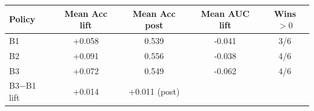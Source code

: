 \begin{tabular}{lcccc}
\toprule
Policy & Mean Acc lift & Mean Acc post & Mean AUC lift & Wins $>0$ \\
\midrule
B1 & +0.058 & 0.539 & -0.041 & 3/6 \\
B2 & +0.091 & 0.556 & -0.038 & 4/6 \\
B3 & +0.072 & 0.549 & -0.062 & 4/6 \\
\midrule
B3$-$B1 lift & +0.014 & +0.011 (post) & & \\
\bottomrule
\end{tabular}